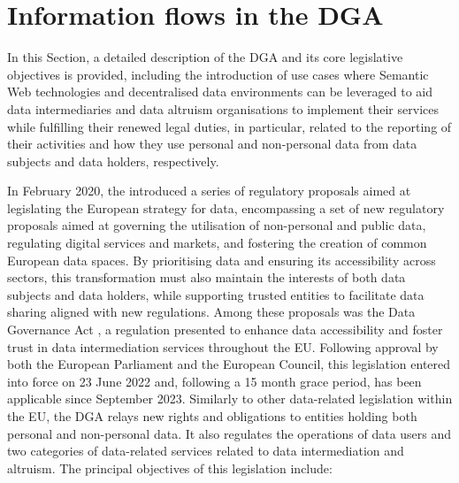 \section{Information flows in the DGA}
\label{sec:dga_flows}

In this Section, a detailed description of the DGA and its core legislative objectives is provided, including the introduction of use cases where Semantic Web technologies and decentralised data environments can be leveraged to aid data intermediaries and data altruism organisations to implement their services while fulfilling their renewed legal duties, in particular, related to the reporting of their activities and how they use personal and non-personal data from data subjects and data holders, respectively.

In February 2020, the \cite{european_commission_communication_2020} introduced a series of regulatory proposals aimed at legislating the European strategy for data, encompassing a set of new regulatory proposals aimed at governing the utilisation of non-personal and public data, regulating digital services and markets, and fostering the creation of common European data spaces.
By prioritising data and ensuring its accessibility across sectors, this transformation must also maintain the interests of both data subjects and data holders, while supporting trusted entities to facilitate data sharing aligned with new regulations.
Among these proposals was the Data Governance Act \citeyearpar{noauthor_regulation_2022}, a regulation presented to enhance data accessibility and foster trust in data intermediation services throughout the EU.
Following approval by both the European Parliament and the European Council, this legislation entered into force on 23 June 2022 and, following a 15 month grace period, has been applicable since September 2023.
Similarly to other data-related legislation within the EU, the DGA relays new rights and obligations to entities holding both personal and non-personal data.
It also regulates the operations of data users and two categories of data-related services related to data intermediation and altruism.
The principal objectives of this legislation include:

